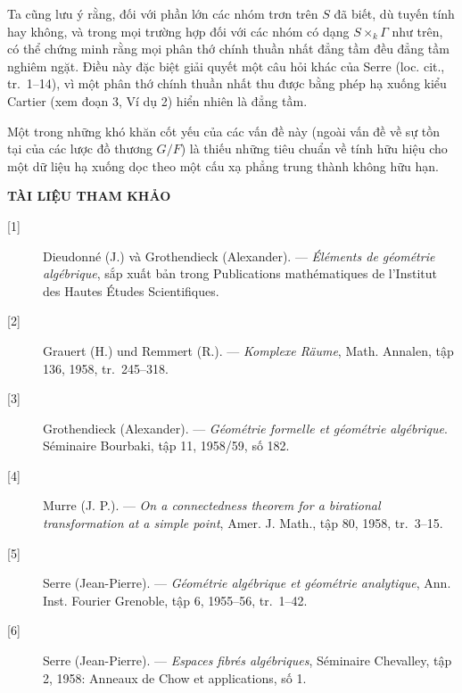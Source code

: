 Ta cũng lưu ý rằng, đối với phần lớn các nhóm trơn trên $S$ đã biết, dù tuyến
tính hay không, và trong mọi trường hợp đối với các nhóm có dạng
$S\times_k\Gamma$ như trên, có thể chứng minh rằng mọi phân thớ chính thuần nhất
đẳng tầm đều đẳng tầm nghiêm ngặt. Điều này đặc biệt giải quyết một câu hỏi khác
của Serre (loc. cit., tr.~1--14), vì một phân thớ chính thuần nhất thu được bằng
phép hạ xuống kiểu Cartier (xem đoạn 3, Ví dụ 2) hiển nhiên là đẳng tầm.

 Một trong những khó khăn cốt yếu của các vấn đề này (ngoài
vấn đề về sự tồn tại của các lược đồ thương $G/F$) là thiếu những tiêu chuẩn về
tính hữu hiệu cho một dữ liệu hạ xuống dọc theo một cấu xạ phẳng trung thành
không hữu hạn.

\begin{center}
  \textbf{TÀI LIỆU THAM KHẢO}
\end{center}

\begin{description}
  \item[{[1]}] Dieudonné (J.) và Grothendieck (Alexander). --- \emph{Éléments
    de géométrie algébrique}, sắp xuất bản trong Publications mathématiques de
    l'Institut des Hautes Études Scientifiques.
  \item[{[2]}] Grauert (H.) und Remmert (R.). --- \emph{Komplexe Räume}, Math.
    Annalen, tập 136, 1958, tr.~245--318.
  \item[{[3]}] Grothendieck (Alexander). --- \emph{Géométrie formelle et
    géométrie algébrique}. Séminaire Bourbaki, tập 11, 1958/59, số 182.
  \item[{[4]}] Murre (J. P.). --- \emph{On a connectedness theorem for a
    birational transformation at a simple point}, Amer. J. Math., tập 80, 1958,
    tr.~3--15.
  \item[{[5]}] Serre (Jean-Pierre). --- \emph{Géométrie algébrique et géométrie
    analytique}, Ann. Inst. Fourier Grenoble, tập 6, 1955--56, tr.~1--42.
  \item[{[6]}] Serre (Jean-Pierre). --- \emph{Espaces fibrés algébriques},
    Séminaire Chevalley, tập 2, 1958: Anneaux de Chow et applications, số 1.
\end{description}

\par
